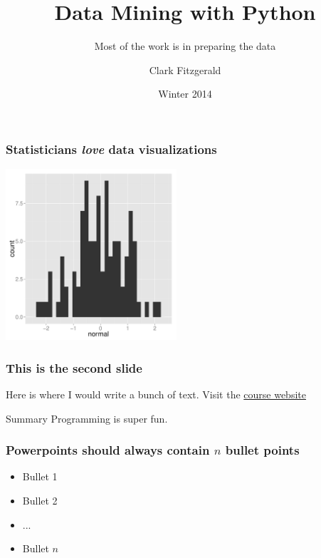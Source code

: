 \documentclass{beamer}
\begin{document}
\title[Python] %
{Data Mining with Python}
\subtitle{Most of the work is in preparing the data}
\author{Clark Fitzgerald}
\date{Winter 2014} %
\subject{Statistics}


\frame{\titlepage}


\begin{frame}
\frametitle{Statisticians \emph{love} data visualizations}
\includegraphics[height=2.5in]{figs/normal.pdf}
\end{frame}


\begin{frame}
\frametitle{This is the second slide}
Here is where I would write a bunch of text. Visit the \href{https://github.com/nick-ulle/2015-python-course}{course website}
    \begin{block}{Summary}
    Programming is super fun.
    \end{block}
\end{frame}


\begin{frame}
\frametitle{Powerpoints should always contain $n$ bullet points}

\begin{itemize}
\item Bullet 1
\item Bullet 2
\item ...
\item Bullet $n$
\end{itemize}

\end{frame}
\end{document}
